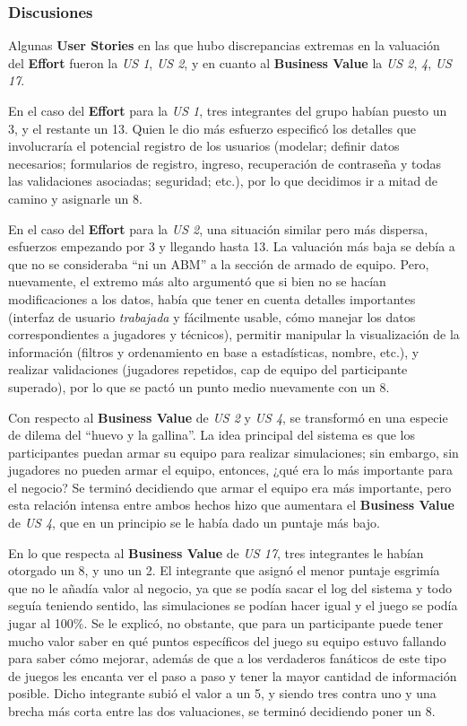 \newpage

\subsubsection*{Discusiones}
Algunas \textbf{User Stories} en las que hubo discrepancias extremas en la valuación del \textbf{Effort} fueron la \emph{US 1}, \emph{US 2}, y en cuanto al \textbf{Business Value} la \emph{US 2}, \emph{4}, \emph{US 17}.

En el caso del \textbf{Effort} para la \emph{US 1}, tres integrantes del grupo habían puesto un 3, y el restante un 13. Quien le dio más esfuerzo especificó los detalles que involucraría el potencial registro de los usuarios (modelar; definir datos necesarios; formularios de registro, ingreso, recuperación de contraseña y todas las validaciones asociadas; seguridad; etc.), por lo que decidimos ir a mitad de camino y asignarle un 8.

En el caso del \textbf{Effort} para la \emph{US 2}, una situación similar pero más dispersa, esfuerzos empezando por 3 y llegando hasta 13. La valuación más baja se debía a que no se consideraba ``ni un ABM'' a la sección de armado de equipo. Pero, nuevamente, el extremo más alto argumentó que si bien no se hacían modificaciones a los datos, había que tener en cuenta detalles importantes (interfaz de usuario \emph{trabajada} y fácilmente usable, cómo manejar los datos correspondientes a jugadores y técnicos), permitir manipular la visualización de la información (filtros y ordenamiento en base a estadísticas, nombre, etc.), y realizar validaciones (jugadores repetidos, cap de equipo del participante superado), por lo que se pactó un punto medio nuevamente con un 8.

Con respecto al \textbf{Business Value} de \emph{US 2} y \emph{US 4}, se transformó en una especie de dilema del ``huevo y la gallina''. La idea principal del sistema es que los participantes puedan armar su equipo para realizar simulaciones; sin embargo, sin jugadores no pueden armar el equipo, entonces, ¿qué era lo más importante para el negocio? Se terminó decidiendo que armar el equipo era más importante, pero esta relación intensa entre ambos hechos hizo que aumentara el \textbf{Business Value} de \emph{US 4}, que en un principio se le había dado un puntaje más bajo.

En lo que respecta al \textbf{Business Value} de \emph{US 17}, tres integrantes le habían otorgado un 8, y uno un 2. El integrante que asignó el menor puntaje esgrimía que no le añadía valor al negocio, ya que se podía sacar el log del sistema y todo seguía teniendo sentido, las simulaciones se podían hacer igual y el juego se podía jugar al 100\%. Se le explicó, no obstante, que para un participante puede tener mucho valor saber en qué puntos específicos del juego su equipo estuvo fallando para saber cómo mejorar, además de que a los verdaderos fanáticos de este tipo de juegos les encanta ver el paso a paso y tener la mayor cantidad de información posible. Dicho integrante subió el valor a un 5, y siendo tres contra uno y una brecha más corta entre las dos valuaciones, se terminó decidiendo poner un 8.
